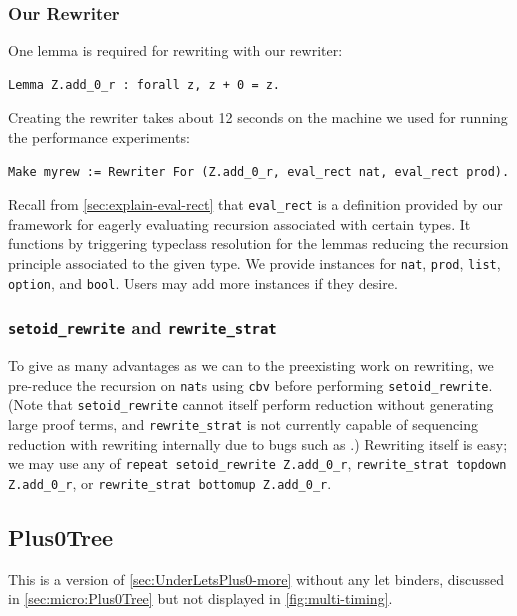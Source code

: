 \begin{subappendices}
\subsubsection{Our Rewriter}
One lemma is required for rewriting with our rewriter:
\begin{verbatim}
Lemma Z.add_0_r : forall z, z + 0 = z.
\end{verbatim}

Creating the rewriter takes about 12 seconds on the machine we used for running the performance experiments:
\begin{verbatim}
Make myrew := Rewriter For (Z.add_0_r, eval_rect nat, eval_rect prod).
\end{verbatim}
Recall from \autoref{sec:explain-eval-rect} that \texttt{eval_rect} is a definition provided by our framework for eagerly evaluating recursion associated with certain types.
It functions by triggering typeclass resolution for the lemmas reducing the recursion principle associated to the given type.
We provide instances for \texttt{nat}, \texttt{prod}, \texttt{list}, \texttt{option}, and \texttt{bool}.
Users may add more instances if they desire.

\subsubsection{\texorpdfstring{\texttt{setoid\_rewrite}}{setoid\_rewrite} and \texorpdfstring{\texttt{rewrite\_strat}}{rewrite\_strat}}
To give as many advantages as we can to the preexisting work on rewriting, we pre-reduce the recursion on \texttt{nat}s using \texttt{cbv} before performing \texttt{setoid\_rewrite}.
(Note that \texttt{setoid\_rewrite} cannot itself perform reduction without generating large proof terms, and \texttt{rewrite\_strat} is not currently capable of sequencing reduction with rewriting internally due to bugs such as .)
Rewriting itself is easy; we may use any of \texttt{repeat setoid\_rewrite Z.add\_0\_r}, \texttt{rewrite\_strat topdown Z.add\_0\_r}, or \texttt{rewrite\_strat bottomup Z.add\_0\_r}.

\subsection{Plus0Tree} \label{sec:Plus0Tree-more}

This is a version of \autoref{sec:UnderLetsPlus0-more} without any let binders, discussed in \autoref{sec:micro:Plus0Tree} but not displayed in \autoref{fig:multi-timing}.


\end{subappendices}

